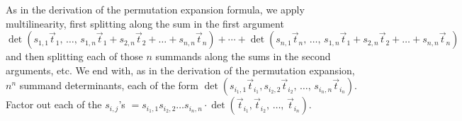 \begin{exercises}
\begin{answer}
     As in the derivation of the permutation expansion formula, we
     apply multilinearity, 
     first splitting along the sum in the first argument
     \begin{equation*}
         \det(s_{1,1}\vec{t}_1,\,
            \dots,\,
            s_{1,n}\vec{t}_1+s_{2,n}\vec{t}_2+\dots+s_{n,n}\vec{t}_n) 
        +\cdots{}                                             
        +\det(s_{n,1}\vec{t}_n,\,
           \ldots,\,
            s_{1,n}\vec{t}_1+s_{2,n}\vec{t}_2+\dots+s_{n,n}\vec{t}_n)
     \end{equation*}
     and then splitting each of those $n$ summands along the sums 
     in the second arguments, etc.
     We end with, as in the derivation of the permutation expansion, 
     \( n^n \) summand determinants, each of the form
     $\det(s_{i_1,1}\vec{t}_{i_1},s_{i_2,2}\vec{t}_{i_2},
            \,\dots,\,
            s_{i_n,n}\vec{t}_{i_n})$.
     Factor out each of the $s_{i,j}$'s
     $=
       s_{i_1,1}s_{i_2,2}\dots s_{i_n,n}
        \cdot\det(\vec{t}_{i_1},\vec{t}_{i_2},
       \,\dots,\,
       \vec{t}_{i_n})
      $.


\end{answer}
\end{exercises}
